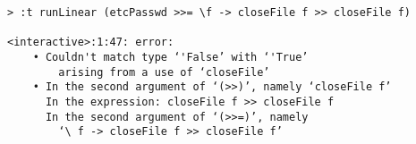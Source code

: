\begin{repl}\begin{lstlisting}
> :t runLinear (etcPasswd >>= \f -> closeFile f >> closeFile f)

<interactive>:1:47: error:
    • Couldn't match type ‘'False’ with ‘'True’
        arising from a use of ‘closeFile’
    • In the second argument of ‘(>>)’, namely ‘closeFile f’
      In the expression: closeFile f >> closeFile f
      In the second argument of ‘(>>=)’, namely
        ‘\ f -> closeFile f >> closeFile f’\end{lstlisting}\end{repl}
